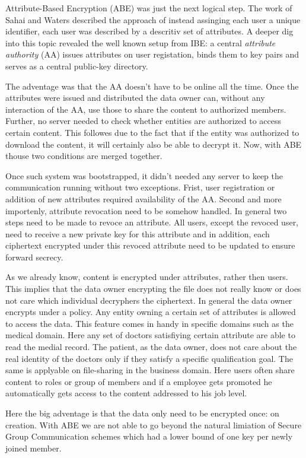 Attribute-Based Encryption (ABE) was just the next logical step. The work of Sahai and Waters \cite{sahai2005fuzzy} described the approach of instead assinging each user a unique identifier, each user was described by a descritiv set of attributes. A deeper dig into this topic revealed the well known setup from IBE: a central \textit{attribute authority} (AA) issues attributes on user registation, binds them to key pairs and serves as a central public-key directory. 

The adventage was that the AA doesn't have to be online all the time. Once the attributes were issued and distributed the data owner can, without any interaction of the AA, use those to share the content to authorized members. Further, no server needed to check whether entities are authorized to access certain content. This followes due to the fact that if the entity was authorized to download the content, it will certainly also be able to decrypt it. Now, with ABE thouse two conditions are merged together.

Once such system was bootstrapped, it didn't needed any server to keep the communication running without two exceptions. Frist, user registration or addition of new attributes required availability of the AA. Second and more importenly, attribute revocation need to be somehow handled. In general two steps need to be made to revoce an attribute. All users, except the revoced user, need to receive a new private key for this attribute and in addition, each ciphertext encrypted under this revoced attribute need to be updated to ensure forward secrecy. 

As we already know, content is encrypted under attributes, rather then users. This implies that the data owner encrypting the file does not really know or does not care which individual decryphers the ciphertext. In general the data owner encrypts under a policy. Any entity owning a certain set of attributes is allowed to access the data. This feature comes in handy in specific domains such as the medical domain. Here any set of doctors satisfiying certain attribute are able to read the medial record. The patient, as the data owner, does not care about the real identity of the doctors only if they satisfy a specific qualification goal. The same is applyable on file-sharing in the business domain. Here users often share content to roles or group of members and if a employee gets promoted he automatically gets access to the content addressed to his job level. 

Here the big adventage is that the data only need to be encrypted once: on creation. With ABE we are not able to go beyond the natural limiation of Secure Group Communication schemes which had a lower bound of one key per newly joined member.  

